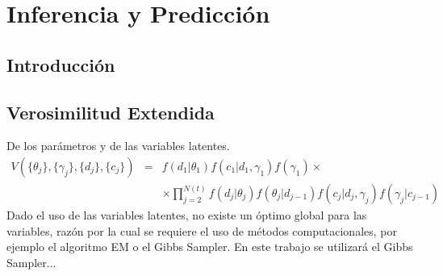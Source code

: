 \chapter{Inferencia y Predicci\'on}
\section{Introducci\'on}

\section{Verosimilitud Extendida}
De los par\'ametros y de las variables latentes.
\begin{eqnarray}
V(\{\theta_j\},\{\gamma_j\},\{d_j\},\{c_j\}) &=& f(d_1|\theta_1)f(c_1|d_1,\gamma_1)f(\gamma_1) \times\nonumber\\
&& \times \prod_{j=2}^{N(t)} f(d_j|\theta_j)f(\theta_j|d_{j-1})f(c_j|d_j,\gamma_j)f(\gamma_j|c_{j-1})\nonumber
\end{eqnarray}
Dado el uso de las variables latentes, no existe un \'optimo global para las variables, raz\'on por la cual se requiere el uso de m\'etodos computacionales, por ejemplo el algoritmo EM o el Gibbs Sampler. En este trabajo se utilizar\'a el Gibbs Sampler...\\

